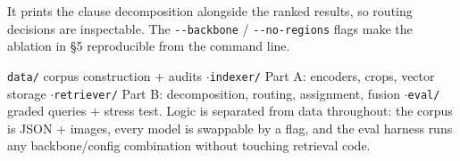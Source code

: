 \documentclass[10pt,a4paper]{article}
\begin{document}
It prints the clause decomposition alongside the ranked results, so routing decisions are
inspectable. The \texttt{-{}-backbone} / \texttt{-{}-no-regions} flags make the ablation
in \S5 reproducible from the command line.

{\small \texttt{data/} corpus construction + audits \quad$\cdot$\quad \texttt{indexer/}
Part A: encoders, crops, vector storage \quad$\cdot$\quad \texttt{retriever/} Part B:
decomposition, routing, assignment, fusion \quad$\cdot$\quad \texttt{eval/} graded
queries + stress test. Logic is separated from data throughout: the corpus is JSON +
images, every model is swappable by a flag, and the eval harness runs any
backbone/config combination without touching retrieval code.}
\end{document}
